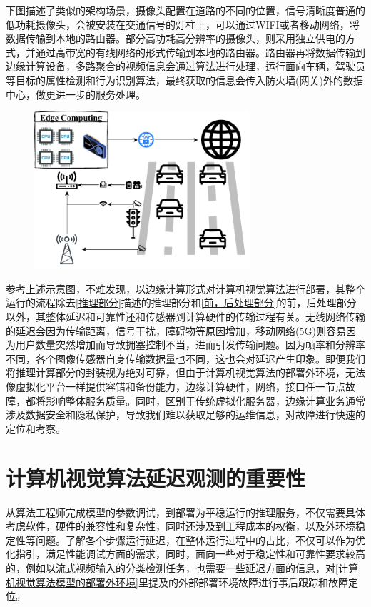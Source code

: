 \documentclass[master]{shtthesis}
\begin{document}
下图描述了类似的架构场景，摄像头配置在道路的不同的位置，信号清晰度普通的低功耗摄像头，会被安装在交通信号的灯柱上，可以通过WIFI或者移动网络，将数据传输到本地的路由器。部分高功耗高分辨率的摄像头，则采用独立供电的方式，并通过高带宽的有线网络的形式传输到本地的路由器。路由器再将数据传输到边缘计算设备，多路聚合的视频信息会通过算法进行处理，运行面向车辆，驾驶员等目标的属性检测和行为识别算法，最终获取的信息会传入防火墙(网关)外的数据中心，做更进一步的服务处理。

\begin{figure}[H]
	\centering
	\includegraphics[width=8cm]{img/trafic.pdf}
	\label{交通场景的边缘计算部署}
\end{figure}

参考上述示意图，不难发现，以边缘计算形式对计算机视觉算法进行部署，其整个运行的流程除去\ref{推理部分}描述的推理部分和\ref{前，后处理部分}的前，后处理部分以外，其整体延迟和可靠性还和传感器到计算硬件的传输过程有关。无线网络传输的延迟会因为传输距离，信号干扰，障碍物等原因增加，移动网络(5G)则容易因为用户数量突然增加而导致拥塞控制不当，进而引发传输问题。因为帧率和分辨率不同，各个图像传感器自身传输数据量也不同，这也会对延迟产生印象。即便我们将推理计算部分的封装视为绝对可靠，但由于计算机视觉算法的部署外环境，无法像虚拟化平台一样提供容错和备份能力，边缘计算硬件，网络，接口任一节点故障，都将影响整体服务质量。同时，区别于传统虚拟化服务器，边缘计算业务通常涉及数据安全和隐私保护，导致我们难以获取足够的运维信息，对故障进行快速的定位和考察。

\section{计算机视觉算法延迟观测的重要性}\label{计算机视觉算法延迟观测的重要性}
从算法工程师完成模型的参数调试，到部署为平稳运行的推理服务，不仅需要具体考虑软件，硬件的兼容性和复杂性，同时还涉及到工程成本的权衡，以及外环境稳定性等问题。了解各个步骤运行延迟，在整体运行过程中的占比，不仅可以作为优化指引，满足性能调试方面的需求，同时，面向一些对于稳定性和可靠性要求较高的，例如以流式视频输入的分类检测任务，也需要一些延迟方面的信息，对\ref{计算机视觉算法模型的部署外环境}里提及的外部部署环境故障进行事后跟踪和故障定位。
\end{document}
